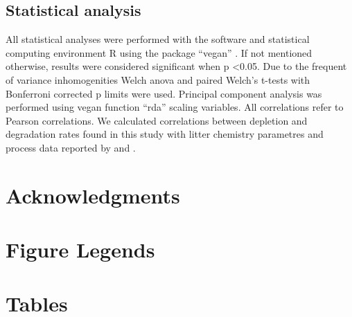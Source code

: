 \documentclass[10pt]{article}
\begin{document}
\subsection*{Statistical analysis}
All statistical analyses were performed with the software and statistical computing environment R using the package ``vegan'' \cite{Oksanen2011}. If not mentioned otherwise, results were considered significant when p \textless 0.05. Due to the frequent of variance inhomogenities Welch anova and paired Welch's t-tests with Bonferroni corrected p limits were used. Principal component analysis was performed using vegan function ``rda'' scaling variables. All correlations refer to Pearson correlations. We calculated correlations between depletion and degradation rates found in this study with litter chemistry parametres and process data reported by \cite{Mooshammer2011} and \cite{Leitner2011}.

\section*{Acknowledgments}




\section*{Figure Legends}


\section*{Tables}
\end{document}
